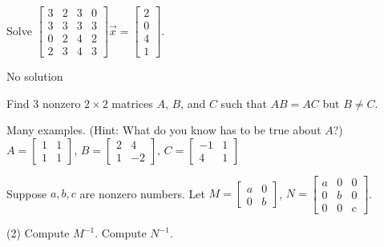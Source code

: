\begin{exercise}
Solve
$\left[ \begin{smallmatrix}
3 & 2 & 3 & 0 \\
3 & 3 & 3 & 3 \\
0 & 2 & 4 & 2 \\
2 & 3 & 4 & 3 
\end{smallmatrix} \right] \vec{x} =
\left[ \begin{smallmatrix}
2 \\
0 \\
4 \\
1
\end{smallmatrix} \right]$.
\end{exercise}
\comboSol{%
}
{%
No solution
}

\begin{exercise}
Find 3 nonzero $2 \times 2$ matrices $A$, $B$, and $C$ such that
$AB = AC$ but $B \not= C$.
\end{exercise}
\comboSol{%
}
{%
Many examples. (Hint: What do you know has to be true about $A$?) $A = \left[\begin{smallmatrix}  1 & 1 \\ 1 & 1 \end{smallmatrix}\right]$, $B = \left[\begin{smallmatrix}  2 & 4\\ 1 & -2 \end{smallmatrix}\right]$, $C = \left[\begin{smallmatrix} -1 & 1 \\ 4 & 1 \end{smallmatrix}\right]$
}

\begin{exercise}\ansMark%
Suppose $a, b, c$ are nonzero numbers.
Let
$M=\left[ \begin{smallmatrix}
a & 0 \\
0 & b
\end{smallmatrix}\right]$,
$N=\left[ \begin{smallmatrix}
a & 0 & 0 \\
0 & b & 0 \\
0 & 0 & c
\end{smallmatrix}\right]$.
\begin{tasks}(2)
\task Compute $M^{-1}$.
\task Compute $N^{-1}$.
\end{tasks}
\end{exercise}

